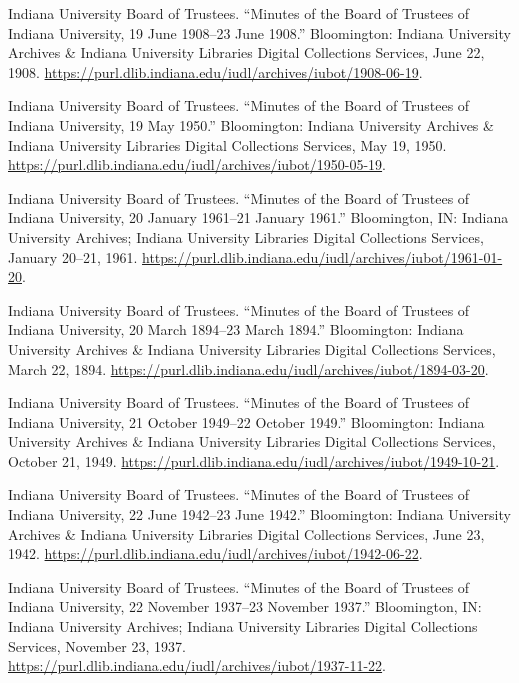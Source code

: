 \documentclass[
  american,
  letterpaper,
]{scrreprt}
\newlength{\cslhangindent}
\newenvironment{CSLReferences}[2] %
 {\begin{list}{}{%
  \setlength{\itemindent}{0pt}
  \setlength{\leftmargin}{0pt}
  \setlength{\parsep}{0pt}
  \ifodd #1
   \setlength{\leftmargin}{\cslhangindent}
   \setlength{\itemindent}{-1\cslhangindent}
  \fi
  \setlength{\itemsep}{#2\baselineskip}}}
 {\end{list}}
\begin{document}
\begin{CSLReferences}{1}{0}
Indiana University Board of Trustees. {``Minutes of the Board of
Trustees of Indiana University, 19 June 1908--23 June 1908.''}
Bloomington: Indiana University Archives \& Indiana University Libraries
Digital Collections Services, June 22, 1908.
\url{https://purl.dlib.indiana.edu/iudl/archives/iubot/1908-06-19}.

Indiana University Board of Trustees. {``Minutes of the Board of
Trustees of Indiana University, 19 May 1950.''} Bloomington: Indiana
University Archives \& Indiana University Libraries Digital Collections
Services, May 19, 1950.
\url{https://purl.dlib.indiana.edu/iudl/archives/iubot/1950-05-19}.

Indiana University Board of Trustees. {``Minutes of the Board of
Trustees of Indiana University, 20 January 1961--21 January 1961.''}
Bloomington, IN: Indiana University Archives; Indiana University
Libraries Digital Collections Services, January 20--21, 1961.
\url{https://purl.dlib.indiana.edu/iudl/archives/iubot/1961-01-20}.

Indiana University Board of Trustees. {``Minutes of the Board of
Trustees of Indiana University, 20 March 1894--23 March 1894.''}
Bloomington: Indiana University Archives \& Indiana University Libraries
Digital Collections Services, March 22, 1894.
\url{https://purl.dlib.indiana.edu/iudl/archives/iubot/1894-03-20}.

Indiana University Board of Trustees. {``Minutes of the Board of
Trustees of Indiana University, 21 October 1949--22 October 1949.''}
Bloomington: Indiana University Archives \& Indiana University Libraries
Digital Collections Services, October 21, 1949.
\url{https://purl.dlib.indiana.edu/iudl/archives/iubot/1949-10-21}.

Indiana University Board of Trustees. {``Minutes of the Board of
Trustees of Indiana University, 22 June 1942--23 June 1942.''}
Bloomington: Indiana University Archives \& Indiana University Libraries
Digital Collections Services, June 23, 1942.
\url{https://purl.dlib.indiana.edu/iudl/archives/iubot/1942-06-22}.

Indiana University Board of Trustees. {``Minutes of the Board of
Trustees of Indiana University, 22 November 1937--23 November 1937.''}
Bloomington, IN: Indiana University Archives; Indiana University
Libraries Digital Collections Services, November 23, 1937.
\url{https://purl.dlib.indiana.edu/iudl/archives/iubot/1937-11-22}.


\end{CSLReferences}
\end{document}
